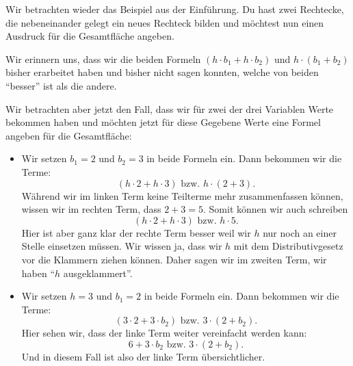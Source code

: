 \documentclass[../../main.tex]{subfiles}
\begin{document}
	\begin{example}{}
		Wir betrachten wieder das Beispiel aus der Einführung. Du hast zwei Rechtecke, die nebeneinander gelegt
		ein neues Rechteck bilden und möchtest nun einen Ausdruck für die Gesamtfläche angeben.
		\begin{center}
        \end{center}
		Wir erinnern uns, dass wir die beiden Formeln $(h\cdot b_1 + h\cdot b_2)$ und $h\cdot (b_1+b_2)$
		bisher erarbeitet haben und bisher nicht sagen konnten, welche von beiden \enquote{besser} ist als die
		andere.

		Wir betrachten aber jetzt den Fall, dass wir für zwei der drei Variablen Werte bekommen haben und möchten
		jetzt für diese Gegebene Werte eine Formel angeben für die Gesamtfläche:
		\begin{itemize}
			\item Wir setzen $b_1=2$ und $b_2=3$ in beide Formeln ein. Dann bekommen wir die Terme:
				\[(h\cdot 2 + h\cdot 3) \text{ bzw. } h\cdot(2+3).\]
				Während wir im linken Term keine Teilterme mehr zusammenfassen können, wissen wir im rechten Term, dass $2+3=5$.
				Somit können wir auch schreiben
				\[(h\cdot 2 + h\cdot 3) \text{ bzw. } h\cdot 5.\]
				Hier ist aber ganz klar der rechte Term besser weil wir $h$ nur noch an einer Stelle einsetzen müssen.
				Wir wissen ja, dass wir $h$ mit dem Distributivgesetz vor die Klammern ziehen können. Daher sagen wir
				im zweiten Term, wir haben \enquote{$h$ ausgeklammert}.
			\item Wir setzen $h=3$ und $b_1=2$ in beide Formeln ein. Dann bekommen wir die Terme:
				\[(3\cdot2+3\cdot b_2) \text{ bzw. } 3\cdot(2+b_2).\]
				Hier sehen wir, dass der linke Term weiter vereinfacht werden kann:
				\[6+3\cdot b_2 \text{ bzw. } 3\cdot(2+b_2).\]
				Und in diesem Fall ist also der linke Term übersichtlicher.
		\end{itemize}
	\end{example}
\end{document}
